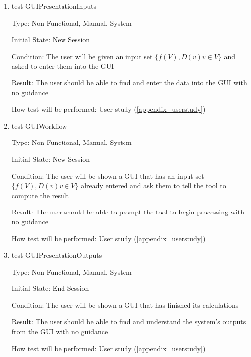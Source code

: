 \documentclass[12pt, titlepage]{article}
\begin{document}
\begin{enumerate}
	
	\item{test-GUIPresentationInputs}
	
	Type: Non-Functional, Manual, System
	
	Initial State: New Session
	
	Condition: The user will be given an input set $\{f(V), D(v) v \in V\}$ and 
	asked to enter them into the GUI
	
	Result: The user should be able to find and enter the data into the GUI 
	with no guidance
	
	How test will be performed: User study (\ref{appendix_userstudy})\\
	
	\item{test-GUIWorkflow}
	
	Type: Non-Functional, Manual, System
	
	Initial State: New Session
	
	Condition: The user will be shown a GUI that has an input set $\{f(V), D(v) 
	v \in V\}$ already entered and ask them to tell the tool to compute the 
	result
	
	Result: The user should be able to prompt the tool to begin processing with 
	no guidance
	
	How test will be performed: User study (\ref{appendix_userstudy})\\
	
	\item{test-GUIPresentationOutputs}
	
	Type: Non-Functional, Manual, System
	
	Initial State: End Session
	
	Condition: The user will be shown a GUI that has finished its calculations
	
	Result: The user should be able to find and understand the system's outputs 
	from the GUI with no guidance
	
	How test will be performed: User study (\ref{appendix_userstudy})\\
	
\end{enumerate}
\end{document}
